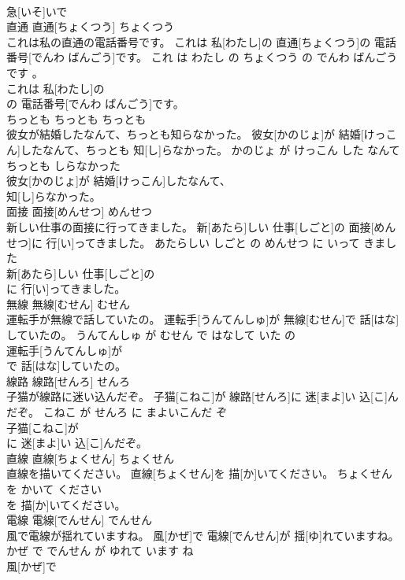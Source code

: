 \documentclass[8pt]{extreport}
\begin{document}
\begin{CJK}{UTF8}{min}
\\	急[いそ]いで
\\	直通	直通[ちょくつう]	ちょくつう	
\\	これは私の直通の電話番号です。	これは 私[わたし]の 直通[ちょくつう]の 電話番号[でんわ ばんごう]です。	これ は わたし の ちょくつう の でんわ ばんごう です 。	
\\	これは 私[わたし]の
\\	の 電話番号[でんわ ばんごう]です。			
\\	ちっとも	ちっとも	ちっとも	
\\	彼女が結婚したなんて、ちっとも知らなかった。	彼女[かのじょ]が 結婚[けっこん]したなんて、ちっとも 知[し]らなかった。	かのじょ が けっこん した なんて ちっとも しらなかった	
\\	彼女[かのじょ]が 結婚[けっこん]したなんて、
\\	知[し]らなかった。			
\\	面接	面接[めんせつ]	めんせつ	
\\	新しい仕事の面接に行ってきました。	新[あたら]しい 仕事[しごと]の 面接[めんせつ]に 行[い]ってきました。	あたらしい しごと の めんせつ に いって きました	
\\	新[あたら]しい 仕事[しごと]の
\\	に 行[い]ってきました。			
\\	無線	無線[むせん]	むせん	
\\	運転手が無線で話していたの。	運転手[うんてんしゅ]が 無線[むせん]で 話[はな]していたの。	うんてんしゅ が むせん で はなして いた の	
\\	運転手[うんてんしゅ]が
\\	で 話[はな]していたの。			
\\	線路	線路[せんろ]	せんろ	
\\	子猫が線路に迷い込んだぞ。	子猫[こねこ]が 線路[せんろ]に 迷[まよ]い 込[こ]んだぞ。	こねこ が せんろ に まよいこんだ ぞ	
\\	子猫[こねこ]が
\\	に 迷[まよ]い 込[こ]んだぞ。			
\\	直線	直線[ちょくせん]	ちょくせん	
\\	直線を描いてください。	直線[ちょくせん]を 描[か]いてください。	ちょくせん を かいて ください	
\\	を 描[か]いてください。			
\\	電線	電線[でんせん]	でんせん	
\\	風で電線が揺れていますね。	風[かぜ]で 電線[でんせん]が 揺[ゆ]れていますね。	かぜ で でんせん が ゆれて います ね	
\\	風[かぜ]で

\end{CJK}
\end{document}
